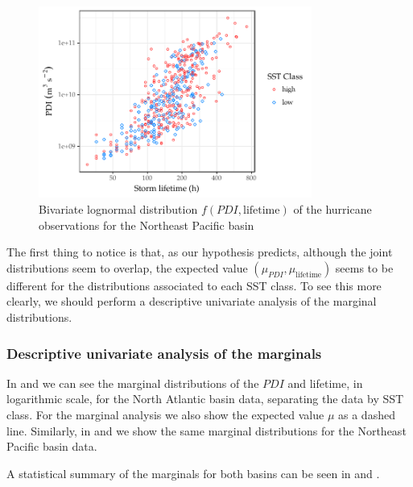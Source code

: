 \begin{figure}[H]
	\centering
	\includegraphics[width=0.8\textwidth]{images/epac-bvln}
	\caption{Bivariate lognormal distribution $f(PDI, \text{lifetime})$ of the hurricane observations for the Northeast Pacific basin}
	\label{fig:epac-bvln}
\end{figure}

The first thing to notice is that, as our hypothesis predicts, although the joint distributions seem to overlap, the expected value $(\mu_{PDI}, \mu_{\text{lifetime}})$ seems to be different for the distributions associated to each SST class. To see this more clearly, we should perform a descriptive univariate analysis of the marginal distributions.

\subsubsection{Descriptive univariate analysis of the marginals}\label{ssec:univariate}


In  and  we can see the marginal distributions of the $PDI$ and lifetime, in logarithmic scale, for the North Atlantic basin data, separating the data by SST class. For the marginal analysis we also show the expected value $\mu$ as a dashed line. Similarly, in  and  we show the same marginal distributions for the Northeast Pacific basin data.

A statistical summary of the marginals for both basins can be seen in  and .

